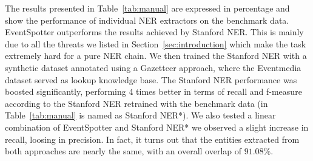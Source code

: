 \documentclass[10pt,a4paper]{article}
\begin{document}
The results presented in Table~\ref{tab:manual} are expressed in percentage and show the performance of individual NER extractors on the benchmark data. EventSpotter outperforms the results achieved by Stanford NER. This is mainly due to all the threats we listed in Section~\ref{sec:introduction} which make the task extremely hard for a pure NER chain. We then trained the Stanford NER with a synthetic dataset annotated using a Gazetteer approach, where the Eventmedia dataset served as lookup knowledge base. The Stanford NER performance was boosted significantly, performing 4 times better in terms of recall and f-measure according to the Stanford NER retrained with the benchmark data (in Table~\ref{tab:manual} is named as Stanford NER*). We also tested a linear combination of EventSpotter and Stanford NER* we observed a slight increase in recall, loosing in precision. In fact, it turns out that the entities extracted from both approaches are nearly the same, with an overall overlap of $91.08\%$.
\end{document}
